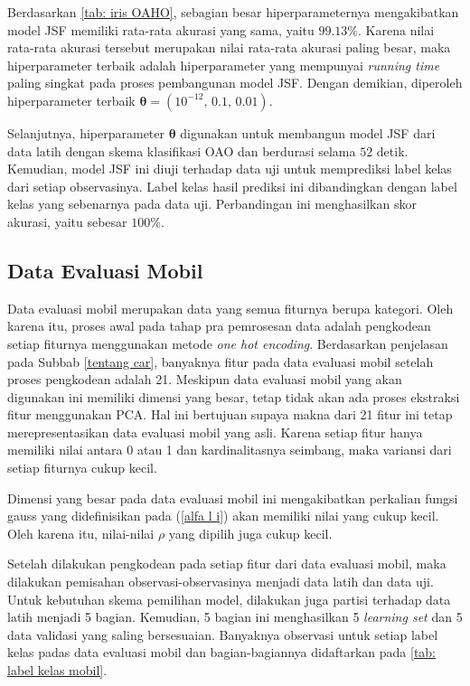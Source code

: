 \noindent Berdasarkan \ref{tab: iris OAHO}, sebagian besar hiperparameternya mengakibatkan model JSF memiliki rata-rata akurasi yang sama, yaitu $\num{99,13}\%$. Karena nilai rata-rata akurasi tersebut merupakan nilai rata-rata akurasi paling besar, maka hiperparameter terbaik adalah hiperparameter yang mempunyai \emph{running time} paling singkat pada proses pembangunan model JSF. Dengan demikian, diperoleh hiperparameter terbaik $\boldsymbol{\theta} = (10^{-12} \text{, } \allowbreak \num{0,1} \text{, } \allowbreak \num{0,01})$.

\noindent Selanjutnya, hiperparameter $\boldsymbol{\theta}$ digunakan untuk membangun model JSF dari data latih dengan skema klasifikasi OAO dan berdurasi selama $52$ detik. Kemudian, model JSF ini diuji terhadap data uji untuk memprediksi label kelas dari setiap observasinya. Label kelas hasil prediksi ini dibandingkan dengan label kelas yang sebenarnya pada data uji. Perbandingan ini menghasilkan skor akurasi, yaitu sebesar $100\%$.

\subsection{Data Evaluasi Mobil}
\noindent Data evaluasi mobil merupakan data yang semua fiturnya berupa kategori. Oleh karena itu, proses awal pada tahap pra pemrosesan data adalah pengkodean setiap fiturnya menggunakan metode \emph{one hot encoding}. Berdasarkan penjelasan pada Subbab \ref{tentang car}, banyaknya fitur pada data evaluasi mobil setelah proses pengkodean adalah 21. Meskipun data evaluasi mobil yang akan digunakan ini memiliki dimensi yang besar, tetap tidak akan ada proses ekstraksi fitur menggunakan PCA. Hal ini bertujuan supaya makna dari 21 fitur ini tetap merepresentasikan data evaluasi mobil yang asli. Karena setiap fitur hanya memiliki nilai antara 0 atau 1 dan kardinalitasnya seimbang, maka variansi dari setiap fiturnya cukup kecil.

\noindent Dimensi yang besar pada data evaluasi mobil ini mengakibatkan perkalian fungsi gauss yang didefinisikan pada (\ref{alfa l i}) akan memiliki nilai yang cukup kecil. Oleh karena itu, nilai-nilai $\rho$ yang dipilih juga cukup kecil.

\noindent Setelah dilakukan pengkodean pada setiap fitur dari data evaluasi mobil, maka dilakukan pemisahan observasi-observasinya menjadi data latih dan data uji. Untuk kebutuhan skema pemilihan model, dilakukan juga partisi terhadap data latih menjadi 5 bagian. Kemudian, 5 bagian ini menghasilkan 5 \emph{learning set} dan 5 data validasi yang saling bersesuaian. Banyaknya observasi untuk setiap label kelas padas data evaluasi mobil dan bagian-bagiannya didaftarkan pada \ref{tab: label kelas mobil}.

